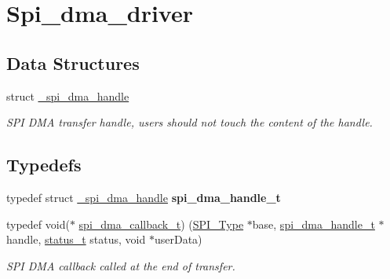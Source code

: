 \hypertarget{group__spi__dma__driver}{}\section{Spi\+\_\+dma\+\_\+driver}
\label{group__spi__dma__driver}
\subsection*{Data Structures}
\begin{DoxyCompactItemize}
\item 
struct \mbox{\hyperlink{struct__spi__dma__handle}{\+\_\+spi\+\_\+dma\+\_\+handle}}
\begin{DoxyCompactList}\small\item\em S\+PI D\+MA transfer handle, users should not touch the content of the handle. \end{DoxyCompactList}\end{DoxyCompactItemize}
\subsection*{Typedefs}
\begin{DoxyCompactItemize}
\item 
\mbox{\label{group__spi__dma__driver_ga82061a780c6c1eba4b269c70d15dcff4}} 
typedef struct \mbox{\hyperlink{struct__spi__dma__handle}{\+\_\+spi\+\_\+dma\+\_\+handle}} {\bfseries spi\+\_\+dma\+\_\+handle\+\_\+t}
\item 
\mbox{\label{group__spi__dma__driver_gacbd157eee3bc09fe3156002bf242d15f}} 
typedef void($\ast$ \mbox{\hyperlink{group__spi__dma__driver_gacbd157eee3bc09fe3156002bf242d15f}{spi\+\_\+dma\+\_\+callback\+\_\+t}}) (\mbox{\hyperlink{struct_s_p_i___type}{S\+P\+I\+\_\+\+Type}} $\ast$base, \mbox{\hyperlink{struct__spi__dma__handle}{spi\+\_\+dma\+\_\+handle\+\_\+t}} $\ast$handle, \mbox{\hyperlink{group__ksdk__common_gaaabdaf7ee58ca7269bd4bf24efcde092}{status\+\_\+t}} status, void $\ast$user\+Data)
\begin{DoxyCompactList}\small\item\em S\+PI D\+MA callback called at the end of transfer. \end{DoxyCompactList}\end{DoxyCompactItemize}

